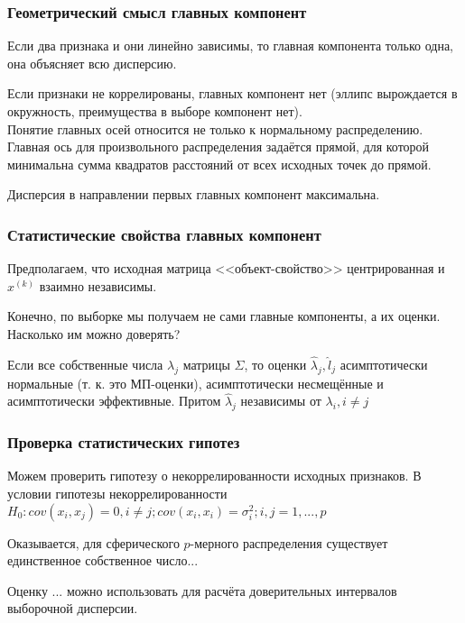 \documentclass[main.tex]{subfiles}
\begin{document}
\subsubsection{Геометрический смысл главных компонент}

Если два признака и они линейно зависимы, то главная компонента только одна, она объясняет всю дисперсию.

Если признаки не коррелированы, главных компонент нет (эллипс вырождается в окружность, преимущества в выборе компонент нет). \\

Понятие главных осей относится не только к нормальному распределению.
Главная ось для произвольного распределения задаётся прямой, для которой минимальна сумма квадратов расстояний от всех исходных точек до прямой.

Дисперсия в направлении первых главных компонент максимальна.

\subsubsection{Статистические свойства главных компонент}

Предполагаем, что исходная матрица <<объект-свойство>> центрированная и $x^{(k)}$ взаимно независимы.

Конечно, по выборке мы получаем не сами главные компоненты, а их оценки.
Насколько им можно доверять?

Если все собственные числа $\lambda_j$ матрицы $\Sigma$, то оценки $\hat \lambda_j, \hat l_j $ асимптотически нормальные (т. к. это МП-оценки), асимптотически несмещённые и асимптотически эффективные.
Притом $ \hat \lambda_j  $ независимы от $ \lambda_i, i \ne j $

\subsubsection{Проверка статистических гипотез}

Можем проверить гипотезу о некоррелированности исходных признаков.
В условии гипотезы некоррелированности $ H_0 : cov(x_i, x_j)=0, i \ne j; cov(x_i, x_i) = \sigma_i^2; i,j = 1, ..., p $

Оказывается, для сферического $p$-мерного распределения существует единственное собственное число...

Оценку ... можно использовать для расчёта доверительных интервалов выборочной дисперсии.

\end{document}
